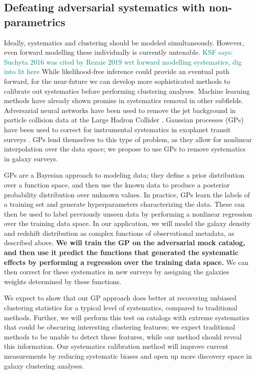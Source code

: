 \documentclass[12pt, fullpage, letterpaper]{article}
\newcommand{\KSF}[1]{\textcolor{teal}{KSF says: #1}}
\begin{document}
\subsection{Defeating adversarial systematics with non-parametrics}

Ideally, systematics and clustering should be modeled simultaneously. 
However, even forward modelling these individually is currently untenable. \KSF{Suchyta 2016 was cited by Rezaie 2019 wrt forward modelling systematics, dig into lit here} 
While likelihood-free inference could provide an eventual path forward, for the near-future we can develop more sophisticated methods to calibrate out systematics before performing clustering analyses.
Machine learning methods have already shown promise in systematics removal in other subfields.
Adversarial neural networks have been used to remove the jet background in particle collision data at the Large Hadron Collider \citep{Shimmin2017}.
Gaussian processes (GPs) have been used to correct for instrumental systematics in exoplanet transit surveys \citep{Gibson2012, Aigrain2016}. 
GPs lend themselves to this type of problem, as they allow for nonlinear interpolation over the data space; we propose to use GPs to remove systematics in galaxy surveys.

GPs are a Bayesian approach to modeling data; they define a prior distribution over a function space, and then use the known data to produce a posterior probability distribution over unknown values. 
In practice, GPs learn the labels of a training set and generate hyperparameters characterizing the data.
These can then be used to label previously unseen data by performing a nonlinear regression over the training data space.
In our application, we will model the galaxy density and redshift distribution as complex functions of observational metadata, as described above.
\textbf{We will train the GP on the adversarial mock catalog, and then use it predict the functions that generated the systematic effects by performing a regression over the training data space.}
We can then correct for these systematics in new surveys by assigning the galaxies weights determined by these functions.

We expect to show that our GP approach does better at recovering unbiased clustering statistics for a typical level of systematics, compared to traditional methods.
Further, we will perform this test on catalogs with extreme systematics that could be obscuring interesting clustering features; we expect traditional methods to be unable to detect these features, while our method should reveal this information.
Our systematics calibration method will improve current measurements by reducing systematic biases and open up more discovery space in galaxy clustering analyses.
\end{document}
